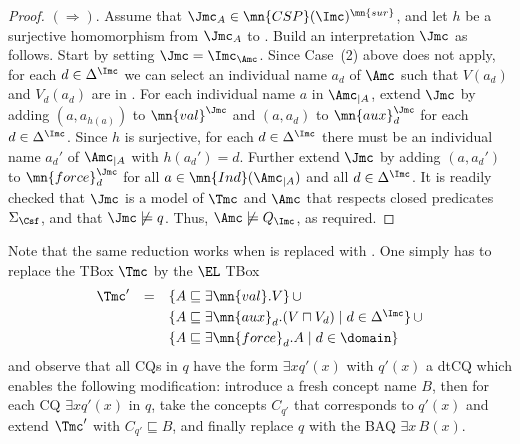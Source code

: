 \documentclass{lmcs}
\theoremstyle{definition}
\begin{document}
\begin{proof}
  $(\Rightarrow)$. Assume that $\Jmc_{A} \in
  \mn{CSP}(\Imc)^{\mn{sur}}$, and let $h$ be a surjective homomorphism
  from $\Jmc_{A}$ to \Imc. Build an interpretation $\Jmc$ as
  follows. Start by setting $\Jmc =\Imc_\Amc$. Since Case~(2) above does
  not apply, for each $d \in \Delta^\Imc$ we can select an individual name
  $a_d$ of $\Amc$ such that $V(a_{d})$ and $V_d(a_{d})$ are in \Amc. For each
  individual name $a$ in $\Amc_{|A}$, extend $\Jmc$ by adding $(a,a_{h(a)})$ to
  $\mn{val}^{\Jmc}$ and $(a,a_d)$ to $\mn{aux}_d^{\Jmc}$ for each $d \in
  \Delta^\Imc$. Since $h$ is surjective, for each $d \in \Delta^\Imc$
  there must be an individual name $a_d'$ of $\Amc_{|A}$ with $h(a_d')=d$. Further
  extend $\Jmc$ by adding $(a,a_d')$ to $\mn{force}_d^{\Jmc}$ for all $a
  \in \mn{Ind}(\Amc_{|A})$ and all $d \in \Delta^\Imc$.  It is readily
  checked that $\Jmc$ is a model of $\Tmc$ and $\Amc$ that respects
  closed predicates $\Sigma_{\Csf}$, and that $\Jmc \not\models q$. Thus, $\Amc\not\models Q_{\Imc}$, as required.
\end{proof}
%
%
Note that the same reduction works when \dllitecore is
replaced with \EL. One simply has to replace the TBox $\Tmc$ by the $\EL$ TBox 
%
$$
\begin{array}{rcl}
	\Tmc' &= &  \{  A \sqsubseteq \exists \mn{val}.V\} \, \cup\\[1mm]
	&& \{  A \sqsubseteq \exists \mn{aux}_d . (V \sqcap V_d) \mid  d \in \Delta^\Imc \} \, \cup \\[1mm]
	&& \{ A \sqsubseteq \exists \mn{force}_d . A \mid d\in\domain \} 
\end{array}	
$$
and observe that all CQs in $q$ have the form $\exists x q'(x)$
with $q'(x)$ a dtCQ which enables the following modification:
introduce a fresh concept name $B$, then for each CQ $\exists x q'(x)$
in $q$, take the \EL concepts $C_{q'}$ that corresponds to $q'(x)$ and
extend $\Tmc'$ with $C_{q'} \sqsubseteq B$, and finally replace $q$
with the BAQ $\exists x \, B(x)$. 
\end{document}

